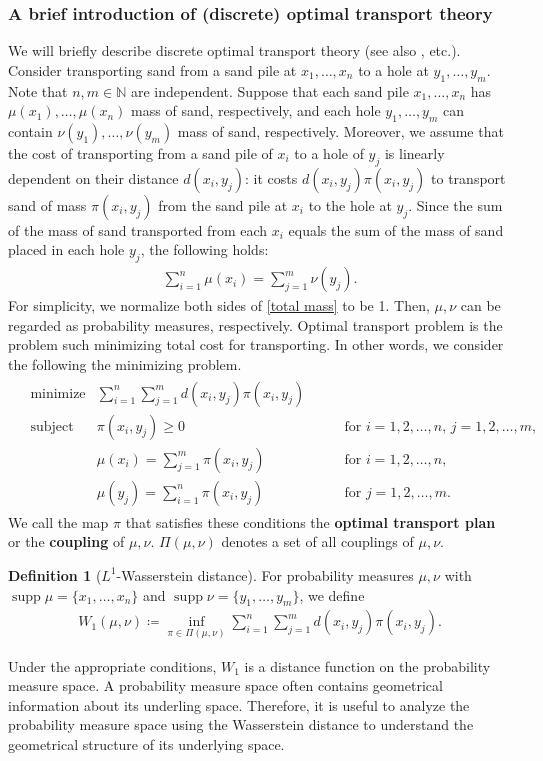\documentclass{article}
\numberwithin{equation}{section}
\theoremstyle{definition}
\newtheorem{definition}{Definition}[section]
\newcommand{\dis}{\displaystyle}
\newcommand{\N}{\mathbb{N}}
\DeclareMathOperator\supp{supp} %
\def\:={\coloneqq} %
\begin{document}
\subsubsection*{A brief introduction of (discrete) optimal transport theory} 

We will briefly describe discrete optimal transport theory (see also \cite{FG,Sa,Vi}, etc.).
Consider transporting sand from a sand pile at $x_1,\ldots,x_n$ to a hole at $y_1,\ldots,y_m$.
Note that $n,m\in\N$ are independent.
Suppose that each sand pile $x_1,\dots,x_n$ has $\mu(x_1),\ldots,\mu(x_n)$ mass of sand, respectively, and each hole $y_1,\dots,y_m$ can contain $\nu(y_1),\dots,\nu(y_m)$ mass of sand, respectively.
Moreover, we assume that the cost of transporting from a sand pile of $x_i$ to a hole of $y_j$ is linearly dependent on their distance $d(x_i,y_j)$: 
it costs $d(x_i,y_j)\pi(x_i,y_j)$ to transport sand of mass $\pi(x_i,y_j)$ from the sand pile at $x_i$ to the hole at $y_j$.
Since the sum of the mass of sand transported from each $x_i$ equals the sum of the mass of sand placed in each hole $y_j$, the following holds:
\begin{align}
    \dis \sum_{i=1}^n \mu(x_i) = \sum_{j=1}^m \nu(y_j). \label{total mass}
\end{align}
For simplicity, we normalize both sides of \eqref{total mass} to be 1.
Then, $\mu,\nu$ can be regarded as probability measures, respectively.
Optimal transport problem is the problem such minimizing total cost for transporting.
In other words, we consider the following the minimizing problem.
\begin{align}
\begin{aligned}
    & \text{minimize} 
        & \sum_{i=1}^n \sum_{j=1}^m d(x_i,y_j)\pi(x_i,y_j) & & \label{object func.} \\
    & \text{subject to} 
        & \pi(x_i,y_j)\ge 0 & \qquad \text{for } i=1,2,\ldots,n,\, j=1,2,\ldots,m, \\
        & & \mu(x_i)=\sum_{j=1}^m \pi(x_i,y_j) & \qquad \text{for } i=1,2,\ldots,n, \\
        & & \mu(y_j)=\sum_{i=1}^n \pi(x_i,y_j) & \qquad \text{for } j=1,2,\ldots,m. 
\end{aligned}
\end{align}
We call the map $\pi$ that satisfies these conditions the \textbf{optimal transport plan} or the \textbf{coupling} of $\mu,\nu$.
$\Pi(\mu,\nu)$ denotes a set of all couplings of $\mu,\nu$.
\begin{definition}[$L^1$-Wasserstein distance]
For probability measures $\mu,\nu$ with $\supp\mu=\{x_1,\ldots,x_n\}$ and $\supp\nu=\{y_1,\ldots,y_m\}$, we define 
\begin{align}
    W_1(\mu,\nu) \:= \inf_{\pi\in\Pi(\mu,\nu)} \sum_{i=1}^n \sum_{j=1}^m d(x_i,y_j)\pi(x_i,y_j). \label{Wasserstein}
\end{align}
\end{definition}
Under the appropriate conditions, $W_1$ is a distance function on the probability measure space.
A probability measure space often contains geometrical information about its underling space.
Therefore, it is useful to analyze the probability measure space using the Wasserstein distance to understand the geometrical structure of its underlying space.
\end{document}
